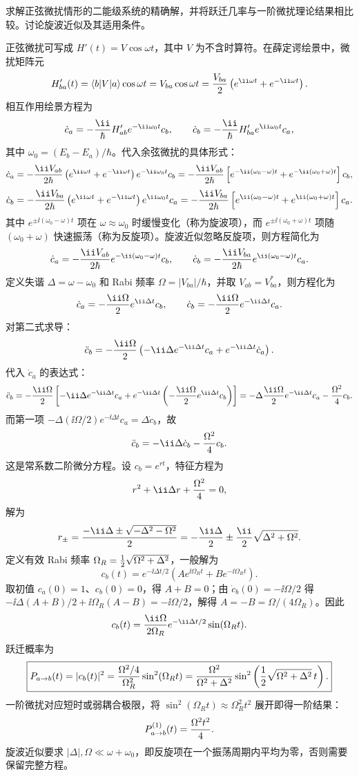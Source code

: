 \begin{question}
求解正弦微扰情形的二能级系统的精确解，并将跃迁几率与一阶微扰理论结果相比较。讨论旋波近似及其适用条件。
\end{question}
\begin{solution}
正弦微扰可写成 $H'(t)=V\cos\omega t$，其中 $V$ 为不含时算符。在薛定谔绘景中，微扰矩阵元
\[
H'_{ba}(t)=\langle b|V|a\rangle\cos\omega t
=V_{ba}\cos\omega t={V_{ba}\over2}\left(e^{\ii\omega t}+e^{-\ii\omega t}\right).
\]
相互作用绘景方程为
\[
\dot c_a=-{\ii\over\hbar}H'_{ab}e^{-\ii\omega_0t}c_b,\qquad
\dot c_b=-{\ii\over\hbar}H'_{ba}e^{\ii\omega_0t}c_a,
\]
其中 $\omega_0=(E_b-E_a)/\hbar$。代入余弦微扰的具体形式：
\[
\dot c_a=-{\ii V_{ab}\over2\hbar}\left(e^{\ii\omega t}+e^{-\ii\omega t}\right)e^{-\ii\omega_0t}c_b
=-{\ii V_{ab}\over2\hbar}\left[e^{-\ii(\omega_0-\omega)t}+e^{-\ii(\omega_0+\omega)t}\right]c_b,
\]
\[
\dot c_b=-{\ii V_{ba}\over2\hbar}\left(e^{\ii\omega t}+e^{-\ii\omega t}\right)e^{\ii\omega_0t}c_a
=-{\ii V_{ba}\over2\hbar}\left[e^{\ii(\omega_0-\omega)t}+e^{\ii(\omega_0+\omega)t}\right]c_a.
\]
其中 $e^{\pm\ii(\omega_0-\omega)t}$ 项在 $\omega\approx\omega_0$ 时缓慢变化（称为旋波项），而 $e^{\pm\ii(\omega_0+\omega)t}$ 项随 $(\omega_0+\omega)$ 快速振荡（称为反旋项）。旋波近似忽略反旋项，则方程简化为
\[
\dot c_a=-{\ii V_{ab}\over2\hbar}e^{-\ii(\omega_0-\omega)t}c_b,\qquad
\dot c_b=-{\ii V_{ba}\over2\hbar}e^{\ii(\omega_0-\omega)t}c_a.
\]
定义失谐 $\Delta=\omega-\omega_0$ 和 Rabi 频率 $\Omega=|V_{ba}|/\hbar$，并取 $V_{ab}=V_{ba}^*$，则方程化为
\[
\dot c_a=-{\ii\Omega\over2}e^{\ii\Delta t}c_b,\qquad
\dot c_b=-{\ii\Omega\over2}e^{-\ii\Delta t}c_a.
\]
对第二式求导：
\[
\ddot c_b=-{\ii\Omega\over2}\left(-\ii\Delta e^{-\ii\Delta t}c_a+e^{-\ii\Delta t}\dot c_a\right).
\]
代入 $\dot c_a$ 的表达式：
\[
\ddot c_b=-{\ii\Omega\over2}\left[-\ii\Delta e^{-\ii\Delta t}c_a
+e^{-\ii\Delta t}\left(-{\ii\Omega\over2}e^{\ii\Delta t}c_b\right)\right]
=-\Delta{\ii\Omega\over2}e^{-\ii\Delta t}c_a-{\Omega^2\over4}c_b.
\]
而第一项 $-\Delta({\ii\Omega}/{2})e^{-\ii\Delta t}c_a=\Delta\dot c_b$，故
\[
\ddot c_b=-\ii\Delta\dot c_b-{\Omega^2\over4}c_b.
\]
这是常系数二阶微分方程。设 $c_b=e^{rt}$，特征方程为
\[
r^2+\ii\Delta r+{\Omega^2\over4}=0,
\]
解为
\[
r_\pm={-\ii\Delta\pm\sqrt{-\Delta^2-\Omega^2}\over2}
=-{\ii\Delta\over2}\pm{\ii\over2}\sqrt{\Delta^2+\Omega^2}.
\]
定义有效 Rabi 频率 $\Omega_R={1\over2}\sqrt{\Omega^2+\Delta^2}$，一般解为
\[
c_b(t)=e^{-\ii\Delta t/2}\left(A e^{\ii\Omega_R t}+B e^{-\ii\Omega_R t}\right).
\]
取初值 $c_a(0)=1$、$c_b(0)=0$，得 $A+B=0$；由 $\dot c_b(0)=-\ii\Omega/2$ 得 $-\ii\Delta(A+B)/2+\ii\Omega_R(A-B)=-\ii\Omega/2$，解得 $A=-B=\Omega/(4\Omega_R)$。因此
\[
c_b(t)={\ii\Omega\over2\Omega_R}e^{-\ii\Delta t/2}\sin(\Omega_R t).
\]
跃迁概率为
\[
\boxed{P_{a\to b}(t)=|c_b(t)|^2={\Omega^2/4\over\Omega_R^2}\sin^2(\Omega_R t)
={\Omega^2\over\Omega^2+\Delta^2}
\sin^2\left({1\over2}\sqrt{\Omega^2+\Delta^2}\,t\right).}
\]
一阶微扰对应短时或弱耦合极限，将 $\sin^2(\Omega_R t)\approx\Omega_R^2 t^2$ 展开即得一阶结果：
\[
P_{a\to b}^{(1)}(t)={\Omega^2 t^2\over4}.
\]
旋波近似要求 $|\Delta|,\Omega\ll\omega+\omega_0$，即反旋项在一个振荡周期内平均为零，否则需要保留完整方程。
\end{solution}

